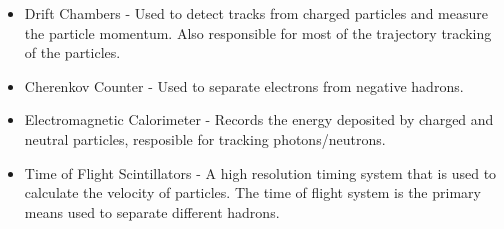 \begin{itemize}
	\item Drift Chambers - Used to detect tracks from charged particles and measure the particle momentum.  Also responsible for most of the trajectory tracking of the particles.
	\item Cherenkov Counter - Used to separate electrons from negative hadrons.
	\item Electromagnetic Calorimeter - Records the energy deposited by charged and neutral particles, resposible for tracking photons/neutrons.
	\item Time of Flight Scintillators - A high resolution timing system that is used to calculate the velocity of particles.  The time of flight system is the primary means used to separate different hadrons.  
\end{itemize}

